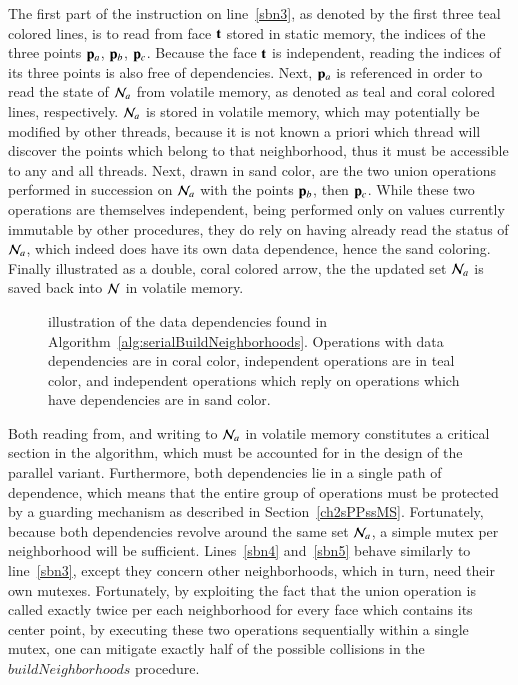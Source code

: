 The first part of the instruction on line~\ref{sbn3}, as denoted by the first three teal colored lines, is to read from face $\mathbf{t}$ stored in static memory, the indices of the three points $\mathbf{p}_a$, $\mathbf{p}_b$, $\mathbf{p}_c$. Because the face $\mathbf{t}$ is independent, reading the indices of its three points is also free of dependencies. Next, $\mathbf{p}_a$ is referenced in order to read the state of $\mathcal{N}_a$ from volatile memory, as denoted as teal and coral colored lines, respectively. $\mathcal{N}_a$ is stored in volatile memory, which may potentially be modified by other threads, because it is not known a priori which thread will discover the points which belong to that neighborhood, thus it must be accessible to any and all threads. Next, drawn in sand color, are the two union operations performed in succession on $\mathcal{N}_a$ with the points $\mathbf{p}_b$, then $\mathbf{p}_c$. While these two operations are themselves independent, being performed only on values currently immutable by other procedures, they do rely on having already read the status of $\mathcal{N}_a$, which indeed does have its own data dependence, hence the sand coloring. Finally illustrated as a double, coral colored arrow, the  the updated set $\mathcal{N}_a$ is saved back into $\mathcal{N}$ in volatile memory.

\begin{figure}[ht]
	
	{\caption[Data Dependencies in Serial Algorithm~\ref{alg:serialBuildNeighborhoods}: Build Neighborhoods]{illustration of the data dependencies found in Algorithm~\ref{alg:serialBuildNeighborhoods}. Operations with data dependencies are in coral color, independent operations are in teal color, and independent operations which reply on operations which have dependencies are in sand color.}\label{fig:sABNdataDependencies}}
\end{figure}

Both reading from, and writing to $\mathcal{N}_a$ in volatile memory constitutes a critical section in the algorithm, which must be accounted for in the design of the parallel variant. Furthermore, both dependencies lie in a single path of dependence, which means that the entire group of operations must be protected by a guarding mechanism as described in Section~\ref{ch2sPPssMS}. Fortunately, because both dependencies revolve around the same set $\mathcal{N}_a$, a simple mutex per neighborhood will be sufficient. Lines~\ref{sbn4} and~\ref{sbn5} behave similarly to line~\ref{sbn3}, except they concern other neighborhoods, which in turn, need their own mutexes. Fortunately, by exploiting the fact that the union operation is called exactly twice per each neighborhood for every face which contains its center point, by executing these two operations sequentially within a single mutex, one can mitigate exactly half of the possible collisions in the $\mathit{buildNeighborhoods}$ procedure.

